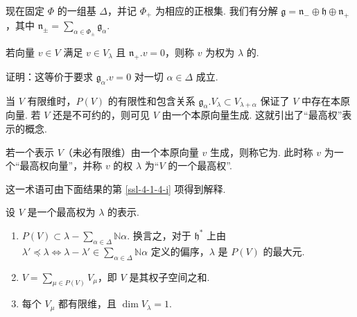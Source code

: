 现在固定 $\Phi$ 的一组基 $\Delta$，并记 $\Phi_+$ 为相应的正根集. 我们有分解 $\mathfrak g=\mathfrak n_-\oplus\mathfrak h\oplus\mathfrak n_+$，其中 $\mathfrak n_\pm=\sum_{\alpha\in\Phi_\pm}\mathfrak g_\alpha$.
\begin{definition}\label{def:ssl-4-1-2}
若向量 $v\in V$ 满足 $v\in V_\lambda$ 且 $\mathfrak n_+.v=0$，则称 $v$ 为权为 $\lambda$ 的.
\end{definition}
\begin{exercise*}
证明：这等价于要求 $\mathfrak g_\alpha.v=0$ 对一切 $\alpha\in\Delta$ 成立.
\end{exercise*}
当 $V$ 有限维时，$P(V)$ 的有限性和包含关系 $\mathfrak g_\alpha.V_\lambda\subset V_{\lambda+\alpha}$ 保证了 $V$ 中存在本原向量. 若 $V$ 还是不可约的，则可见 $V$ 由一个本原向量生成. 这就引出了``最高权''表示的概念.
\begin{definition}\label{def:ssl-4-1-3}
若一个表示 $V$（未必有限维）由一个本原向量 $v$ 生成，则称它为. 此时称 $v$ 为一个``最高权向量''，并称 $v$ 的权 $\lambda$ 为``$V$ 的一个最高权''.
\end{definition}
这一术语可由下面结果的第 \ref{ssl-4-1-4-i} 项得到解释.
\begin{proposition}\label{prop:ssl-4-1-4}
设 $V$ 是一个最高权为 $\lambda$ 的表示.
\begin{enumerate}[label=\roman*)]
\item\label{ssl-4-1-4-i} $P(V)\subset\lambda-\sum_{\alpha\in\Delta}\mathbb N\alpha$. 换言之，对于 $\mathfrak h^*$ 上由 $\lambda'\preccurlyeq\lambda\Longleftrightarrow\lambda-\lambda'\in\sum_{\alpha\in\Delta}\mathbb N\alpha$ 定义的偏序，$\lambda$ 是 $P(V)$ 的最大元.
\item $V=\sum_{\mu\in P(V)}V_\mu$，即 $V$ 是其权子空间之和.
\item 每个 $V_\mu$ 都有限维，且 $\dim V_\lambda=1$.
\end{enumerate}
\end{proposition}
